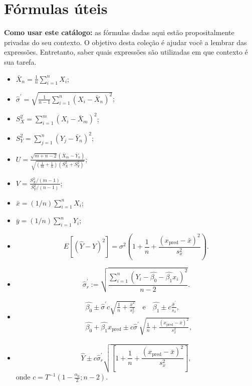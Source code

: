 \documentclass[a4paper,10pt, notitlepage]{report}
\begin{document}
\section*{Fórmulas úteis}
\textbf{Como usar este catálogo:} as fórmulas dadas aqui estão propositalmente privadas do seu contexto.
O objetivo desta coleção é ajudar você a lembrar das expressões.
Entretanto, saber quais expressões são utilizadas em que contexto é sua tarefa.
\begin{itemize}
 \item $ \bar{X}_n = \frac{1}{n} \sum_{i=1}^n X_i$;
 \item $\hat{\sigma}^\prime = \sqrt{\frac{1}{n-1}\sum_{i=1}^n \left(X_i - \bar{X}_n\right)^2}$;
 \item $S_X^2 = \sum_{i=1}^m (X_i-\bar{X}_m)^2$;
 \item $S_Y^2 = \sum_{j=1}^n (Y_j-\bar{Y}_n)^2$;
 \item $U = \frac{\sqrt{m + n - 2}(\bar{X}_m - \bar{Y}_n)}{\sqrt{\left(\frac{1}{m} + \frac{1}{n}\right) (S_X^2 + S_Y^2)}}$;
 \item $ V = \frac{S_X^2/(m-1)}{S_Y^2/(n-1)}$;
 \item $\bar{x} = (1/n)\sum_{i=1}^n X_i$;
 \item $\bar{y} = (1/n)\sum_{i=1}^n Y_i$;
\item \begin{equation*}
        E\left[\left(\hat{Y} - Y\right)^2\right] = \sigma^2 \left(1 + \frac{1}{n} + \frac{\left(x_{\text{pred}}-\bar{x}\right)^2}{s_x^2}\right).
      \end{equation*}
  \item \begin{equation*}
 \hat{\sigma}_r^\prime := \sqrt{\frac{\sum_{i=1}^n \left(Y_i - \hat{\beta_0} - \hat{\beta_1}x_i \right)^2}{n-2}}.
\end{equation*}     
\item \begin{align*}
 &\hat{\beta_0} \pm \hat{\sigma}^\prime c\sqrt{\frac{1}{n} + \frac{\bar{x}^2}{s_x^2}}\quad \text{e}\quad \hat{\beta_1} \pm c\frac{\hat{\sigma}^\prime}{s_x},\\
 &\hat{\beta_0} + \hat{\beta_1}x_{\text{pred}} \pm c \hat{\sigma}^\prime \sqrt{\frac{1}{n} + \frac{\left(x_{\text{pred}}-\bar{x}\right)^2}{s_x^2} },
\end{align*}    
\item \begin{equation*}
 \hat{Y} \pm c\hat{\sigma}_r^\prime \sqrt{\left[ 1+ \frac{1}{n} + \frac{\left(x_{\text{pred}}-\bar{x}\right)^2}{s_x^2} \right]},
\end{equation*}
onde $c = T^{-1}(1-\frac{\alpha_0}{2}; n-2)$.
\end{itemize}




\end{document}
